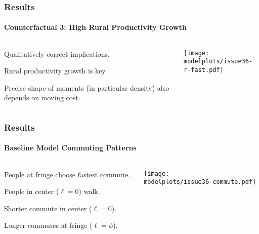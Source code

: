 \documentclass[aspectratio=169]{beamer}
\begin{document}
\begin{frame}
\frametitle{Results}
\framesubtitle{Counterfactual 3: High Rural Productivity Growth}

\begin{columns}
\begin{column}{0.3\textwidth}
\begin{midi}
\item Qualitatively correct implications.
\item Rural productivity growth is key.
\item Precise shape of moments (in particular density) also depends on moving cost.
\end{midi}
\end{column}
\begin{column}{0.7\textwidth}
\begin{adjustbox}{center}
\texttt{[image: \\modelplots/issue36-r-fast.pdf]}\end{adjustbox}
\end{column}\end{columns}
\end{frame}

\begin{frame}
\frametitle{Results}
\framesubtitle{Baseline Model Commuting Patterns}

\begin{columns}
\begin{column}{0.3\textwidth}
\begin{mide}
\item People at fringe choose fastest commute.
\item People in center ($\ell=0$) walk.
\item Shorter commute in center ($\ell=0$).
\item Longer commutes at fringe ($\ell=\phi$).
\end{mide}
\end{column}
\begin{column}{0.7\textwidth}
\begin{adjustbox}{center}
\texttt{[image: \\modelplots/issue36-commute.pdf]}\end{adjustbox}
\end{column}\end{columns}
\end{frame}
\end{document}

